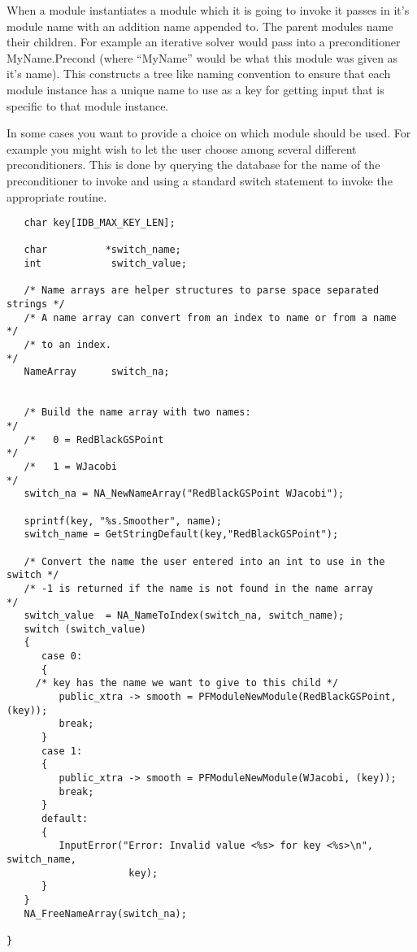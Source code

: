 When a module instantiates a module which it is going to invoke it
passes in it's module name with an addition name appended to.  The
parent modules name their children.  For example an iterative solver
would pass into a preconditioner MyName.Precond (where ``MyName''
would be what this module was given as it's name).  This constructs a
tree like naming convention to ensure that each module instance has a
unique name to use as a key for getting input that is specific to that
module instance.

In some cases you want to provide a choice on which module should be used.
For example you might wish to let the user choose among several different
preconditioners.  This is done by querying the database for the name
of the preconditioner to invoke and using a standard switch statement to
invoke the appropriate  routine.

\begin{display}\begin{verbatim}
   char key[IDB_MAX_KEY_LEN];

   char          *switch_name;
   int            switch_value;

   /* Name arrays are helper structures to parse space separated strings */
   /* A name array can convert from an index to name or from a name      */
   /* to an index.                                                       */
   NameArray      switch_na;

	
   /* Build the name array with two names:                               */
   /*   0 = RedBlackGSPoint                                              */
   /*   1 = WJacobi                                                      */
   switch_na = NA_NewNameArray("RedBlackGSPoint WJacobi");

   sprintf(key, "%s.Smoother", name);
   switch_name = GetStringDefault(key,"RedBlackGSPoint");

   /* Convert the name the user entered into an int to use in the switch */
   /* -1 is returned if the name is not found in the name array          */
   switch_value  = NA_NameToIndex(switch_na, switch_name);
   switch (switch_value)
   {
      case 0:
      {
	 /* key has the name we want to give to this child */
         public_xtra -> smooth = PFModuleNewModule(RedBlackGSPoint, (key));
         break;
      }
      case 1:
      {
         public_xtra -> smooth = PFModuleNewModule(WJacobi, (key));
         break;
      }
      default:
      {
         InputError("Error: Invalid value <%s> for key <%s>\n", switch_name,
                     key);
      }
   }
   NA_FreeNameArray(switch_na);

}
\end{verbatim}\end{display}
